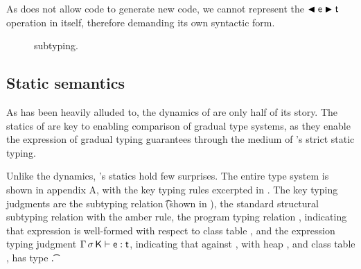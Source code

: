 \documentclass[a4paper,USenglish]{tex/lipics-v2016}
\begin{document}
As \kafka does not allow code to generate new code, we cannot represent the
$\BehCast\e\t$ operation in \kafka itself, therefore demanding its own
syntactic form.

\begin{figure}[!b] \hrulefill\small

\vspace{-2mm}

\begin{mathpar}

\hspace{-8mm}


\hspace{-8mm}

\end{mathpar}

\hrulefill\caption{\kafka subtyping.}\label{sub}%
\end{figure}


\subsection{Static semantics}

As has been heavily alluded to, the dynamics of \kafka are only half of its
story. The statics of \kafka are key to enabling comparison of gradual type
systems, as they enable the expression of gradual typing guarantees through
the medium of \kafka's strict static typing.

Unlike the dynamics, \kafka's statics hold few surprises. The entire type
system is shown in appendix A, with the key typing rules excerpted in
. The key typing judgments are the subtyping relation
\StrSub\M\K\t\tp (shown in ), the standard structural subtyping
relation with the amber rule, the program typing relation \WFp\e\K, indicating
that expression \e is well-formed with respect to class table \K, and the
expression typing judgment $\EnvType \Env\s\K\e\t$, indicating that against
\Env, with heap \s, and class table \K, \e has type \t.
\end{document}
